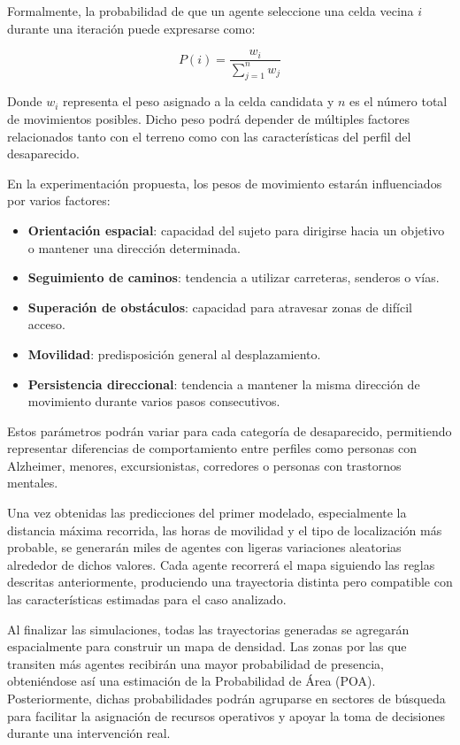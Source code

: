 Formalmente, la probabilidad de que un agente seleccione una celda vecina $i$ durante una iteración puede expresarse como:

\[
P(i)=\frac{w_i}{\sum_{j=1}^{n} w_j}
\]

Donde $w_i$ representa el peso asignado a la celda candidata y $n$ es el número total de movimientos posibles. Dicho peso podrá depender de múltiples factores relacionados tanto con el terreno como con las características del perfil del desaparecido.

En la experimentación propuesta, los pesos de movimiento estarán influenciados por varios factores:

\begin{itemize}
    \item \textbf{Orientación espacial}: capacidad del sujeto para dirigirse hacia un objetivo o mantener una dirección determinada.
    \item \textbf{Seguimiento de caminos}: tendencia a utilizar carreteras, senderos o vías.
    \item \textbf{Superación de obstáculos}: capacidad para atravesar zonas de difícil acceso.
    \item \textbf{Movilidad}: predisposición general al desplazamiento.
    \item \textbf{Persistencia direccional}: tendencia a mantener la misma dirección de movimiento durante varios pasos consecutivos.
\end{itemize}

Estos parámetros podrán variar para cada categoría de desaparecido, permitiendo representar diferencias de comportamiento entre perfiles como personas con Alzheimer, menores, excursionistas, corredores o personas con trastornos mentales.

Una vez obtenidas las predicciones del primer modelado, especialmente la distancia máxima recorrida, las horas de movilidad y el tipo de localización más probable, se generarán miles de agentes con ligeras variaciones aleatorias alrededor de dichos valores. Cada agente recorrerá el mapa siguiendo las reglas descritas anteriormente, produciendo una trayectoria distinta pero compatible con las características estimadas para el caso analizado.

Al finalizar las simulaciones, todas las trayectorias generadas se agregarán espacialmente para construir un mapa de densidad. Las zonas por las que transiten más agentes recibirán una mayor probabilidad de presencia, obteniéndose así una estimación de la Probabilidad de Área (POA). Posteriormente, dichas probabilidades podrán agruparse en sectores de búsqueda para facilitar la asignación de recursos operativos y apoyar la toma de decisiones durante una intervención real.


